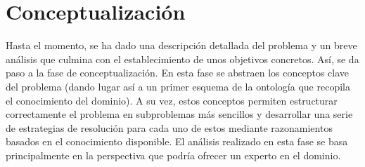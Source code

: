 
\section{Conceptualización} \label{sec:conceptualizacion}

Hasta el momento, se ha dado una descripción detallada del problema y un breve 
análisis que culmina con el establecimiento de unos objetivos concretos. 
Así, se da paso a la fase de conceptualización. En esta fase se abstraen los 
conceptos clave del problema (dando lugar así a un primer esquema de la 
ontología que recopila el conocimiento del dominio). A su vez, estos conceptos 
permiten estructurar correctamente el problema en subproblemas más sencillos 
y desarrollar una serie de estrategias de resolución para cada uno de estos
mediante razonamientos basados en el conocimiento disponible. El análisis 
realizado en esta fase se basa principalmente en la perspectiva que podría 
ofrecer un experto en el dominio.









\clearpage


